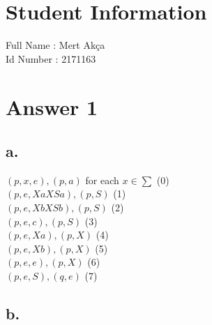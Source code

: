 \documentclass[12pt]{article}
\begin{document}
\section*{Student Information } 
Full Name : Mert Akça \\
Id Number : 2171163 \\

\section*{Answer 1}

\subsection*{a.}

    $(p,x,e),(p,a)$   for each $x \in \sum$ \hfill  (0)\\
    $(p,e,XaXSa),(p,S)$    \hfill  (1)\\
    $(p,e,XbXSb),(p,S)$  \hfill (2)\\
    $(p,e,c),(p,S)$     \hfill  (3)\\
    $(p,e,Xa),(p,X)$    \hfill  (4)\\
    $(p,e,Xb),(p,X)$     \hfill (5)\\
    $(p,e,e),(p,X)$    \hfill   (6)\\
    $(p,e,S),(q,e)$     \hfill  (7)\\


\subsection*{b.}
\end{document}
